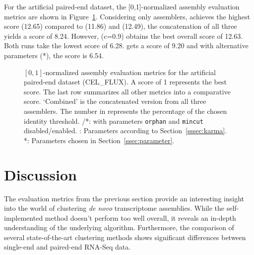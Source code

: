 \documentclass[12pt,a4paper,english]{article}
\begin{document}
	\newpage
    For the artificial paired-end \celegans dataset, the [0,1]-normalized assembly evaluation metrics are shown in Figure~\ref{img:cel_flux}. Considering only assemblers, \trinity achieves the highest score (12.65) compared to \soap (11.86) and \spades (12.49), the concatenation of all three yields a score of 8.24.
	However, \cdhit (c=0.9) obtains the best overall score of 12.63. Both \grouper runs take the lowest score of 6.28. \karma gets a score of 9.20 and with alternative parameters (\karma{}*), the score is 6.54.

	\begin{figure}[H]
		\hspace{-13pt}
		\def\svgwidth{1.1\textwidth}
		
		\caption[Normalized assembly evaluation metrics (\celegans, PE, CEL\_FLUX).]{$[0,1]$-normalized assembly evaluation metrics for the artificial paired-end \celegans dataset (CEL\_FLUX). A score of 1 represents the best score. The last row summarizes all other metrics into a comparative score. `Combined' is the concatenated version from all three assemblers. The number in \cdhit represents the percentage of the chosen identity threshold. \grouper/\grouper{}*: \grouper with parameters \texttt{orphan} and \texttt{mincut} disabled/enabled. \karma: Parameters according to Section~\ref{sssec:karma}. \karma{}*: Parameters chosen in Section~\ref{ssec:parameter}.}
		\label{img:cel_flux}
	\end{figure}


\newpage
\section{Discussion}
	The evaluation metrics from the previous section provide an interesting insight into the world of clustering \textit{de novo} transcriptome assemblies.
	While the self-implemented method \karma doesn't perform too well overall, it reveals an in-depth understanding of the underlying algorithm. Furthermore, the comparison of several state-of-the-art clustering methods shows significant differences between single-end and paired-end RNA-Seq data.
\end{document}
